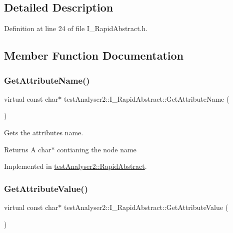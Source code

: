\subsection{Detailed Description}


Definition at line 24 of file I\+\_\+\+Rapid\+Abstract.\+h.



\subsection{Member Function Documentation}
\mbox{\label{classtestAnalyser2_1_1I__RapidAbstract_a70d3e89ca2966dfb205084a1cf1f9f1f}} 
\subsubsection{\texorpdfstring{GetAttributeName()}{GetAttributeName()}}
{\footnotesize\ttfamily virtual const char$\ast$ test\+Analyser2\+::\+I\+\_\+\+Rapid\+Abstract\+::\+Get\+Attribute\+Name (\begin{DoxyParamCaption}{ }\end{DoxyParamCaption})\hspace{0.3cm}{\ttfamily [pure virtual]}}



Gets the attribute\textquotesingle{}s name. 

\begin{DoxyReturn}{Returns}
A char$\ast$ contianing the node name 
\end{DoxyReturn}


Implemented in \mbox{\hyperlink{classtestAnalyser2_1_1RapidAbstract_aa7dd98c70db7f68528247a08717178ab}{test\+Analyser2\+::\+Rapid\+Abstract}}.

\mbox{\label{classtestAnalyser2_1_1I__RapidAbstract_a530a07423a4a8d9afc6222ad41d4879e}} 
\subsubsection{\texorpdfstring{GetAttributeValue()}{GetAttributeValue()}}
{\footnotesize\ttfamily virtual const char$\ast$ test\+Analyser2\+::\+I\+\_\+\+Rapid\+Abstract\+::\+Get\+Attribute\+Value (\begin{DoxyParamCaption}{ }\end{DoxyParamCaption})\hspace{0.3cm}{\ttfamily [pure virtual]}}




